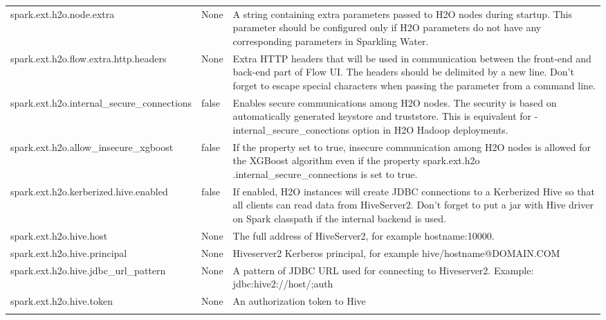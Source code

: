 \documentclass{standalone}
\begin{document}
\begin{footnotesize}
\begin{longtable}[!ht]{l p{2.0cm} p{3.0cm}}
			spark.ext.h2o.node.extra & None & A string containing extra parameters passed to H2O nodes during startup. This parameter should be configured only if H2O parameters do not have any corresponding parameters in Sparkling Water. \\ \addlinespace

			spark.ext.h2o.flow.extra.http.headers & None & Extra HTTP headers that will be used in communication between the front-end and back-end part of Flow UI. The headers should be delimited by a new line. Don't forget to escape special characters when passing the parameter from a command line. \\ \addlinespace

			spark.ext.h2o.internal\_secure\_connections & false & Enables secure communications among H2O nodes. The security is based on automatically generated keystore and truststore. This is equivalent for -internal\_secure\_conections option in H2O Hadoop deployments. \\ \addlinespace

			spark.ext.h2o.allow\_insecure\_xgboost & false & If the property set to true, insecure communication among H2O nodes is allowed for the XGBoost algorithm even if the property spark.ext.h2o .internal\_secure\_connections is set to true. \\ \addlinespace

			spark.ext.h2o.kerberized.hive.enabled & false & If enabled, H2O instances will create JDBC connections to a Kerberized Hive so that all clients can read data from HiveServer2. Don't forget to put a jar with Hive driver on Spark classpath if the internal backend is used. \\ \addlinespace

			spark.ext.h2o.hive.host & None & The full address of HiveServer2, for example hostname:10000. \\ \addlinespace

			spark.ext.h2o.hive.principal & None & Hiveserver2 Kerberos principal, for example hive/hostname@DOMAIN.COM \\ \addlinespace

			spark.ext.h2o.hive.jdbc\_url\_pattern & None & A pattern of JDBC URL used for connecting to Hiveserver2. Example: jdbc:hive2://{{host}}/;{{auth}} \\ \addlinespace

			spark.ext.h2o.hive.token & None & An authorization token to Hive \\ \addlinespace


\end{longtable}
\end{footnotesize}
\end{document}
